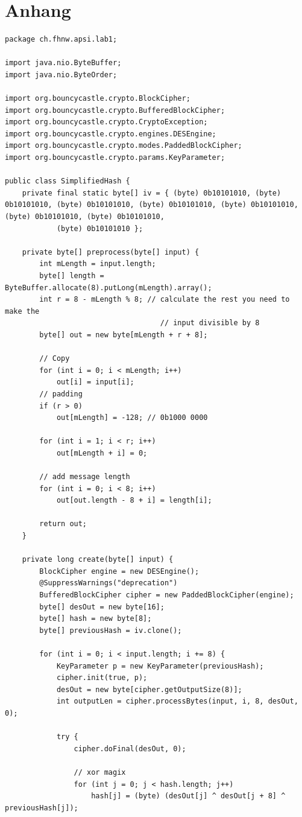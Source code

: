 \documentclass[12pt]{scrartcl}
\begin{document}
\section{Anhang}
\begin{lstlisting}
package ch.fhnw.apsi.lab1;

import java.nio.ByteBuffer;
import java.nio.ByteOrder;

import org.bouncycastle.crypto.BlockCipher;
import org.bouncycastle.crypto.BufferedBlockCipher;
import org.bouncycastle.crypto.CryptoException;
import org.bouncycastle.crypto.engines.DESEngine;
import org.bouncycastle.crypto.modes.PaddedBlockCipher;
import org.bouncycastle.crypto.params.KeyParameter;

public class SimplifiedHash {
	private final static byte[] iv = { (byte) 0b10101010, (byte) 0b10101010, (byte) 0b10101010, (byte) 0b10101010, (byte) 0b10101010, (byte) 0b10101010, (byte) 0b10101010,
			(byte) 0b10101010 };

	private byte[] preprocess(byte[] input) {
		int mLength = input.length;
		byte[] length = ByteBuffer.allocate(8).putLong(mLength).array();
		int r = 8 - mLength % 8; // calculate the rest you need to make the
									// input divisible by 8
		byte[] out = new byte[mLength + r + 8];

		// Copy
		for (int i = 0; i < mLength; i++)
			out[i] = input[i];
		// padding
		if (r > 0)
			out[mLength] = -128; // 0b1000 0000

		for (int i = 1; i < r; i++)
			out[mLength + i] = 0;

		// add message length
		for (int i = 0; i < 8; i++)
			out[out.length - 8 + i] = length[i];

		return out;
	}

	private long create(byte[] input) {
		BlockCipher engine = new DESEngine();
		@SuppressWarnings("deprecation")
		BufferedBlockCipher cipher = new PaddedBlockCipher(engine);
		byte[] desOut = new byte[16];
		byte[] hash = new byte[8];
		byte[] previousHash = iv.clone();

		for (int i = 0; i < input.length; i += 8) {
			KeyParameter p = new KeyParameter(previousHash);
			cipher.init(true, p);
			desOut = new byte[cipher.getOutputSize(8)];
			int outputLen = cipher.processBytes(input, i, 8, desOut, 0);

			try {
				cipher.doFinal(desOut, 0);

				// xor magix
				for (int j = 0; j < hash.length; j++)
					hash[j] = (byte) (desOut[j] ^ desOut[j + 8] ^ previousHash[j]);


\end{lstlisting}
\end{document}

